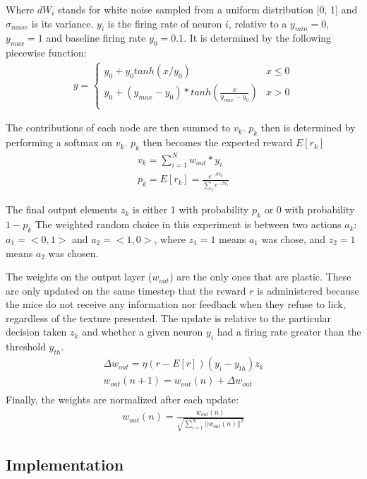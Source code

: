 \documentclass[11pt]{article}
\begin{document}
Where \(dW_i\) stands for white noise sampled from a uniform
distribution {[}0, 1{]} and \(\sigma_{noise}\) is its variance. \(y_i\)
is the firing rate of neuron \(i\), relative to a \(y_{min}=0\),
\(y_{max}=1\) and baseline firing rate \(y_0 = 0.1\). It is determined
by the following piecewise function: \begin{align}
y=   \left\{
\begin{array}{ll}
      y_0 + y_0 tanh(x/y_0) & x \leq 0   \\
      y_0 + (y_{max} - y_0)*tanh(\frac{x}{y_{max}- y_0}) & x > 0 \\
\end{array} 
\right.
\end{align}

The contributions of each node are then summed to \(v_k\). \(p_k\) then
is determined by performing a softmax on \(v_k\). \(p_k\) then becomes
the expected reward \(E[r_k]\) \begin{align}
v_k = \sum_{i=1}^N w_{out} * y_i \\
p_k = E[r_k] = \frac{e^{-\beta v_k}}{\sum_i e^{-\beta v_i}}
\end{align}

The final output elements \(z_k\) is either 1 with probability \(p_k\)
or 0 with probability \(1 - p_k\) The weighted random choice in this
experiment is between two actions \(a_k\): \(a_1=<0, 1>\) and
\(a_2=<1,0>\), where \(z_1 = 1\) means \(a_1\) was chose, and \(z_2=1\)
means \(a_2\) was chosen.

The weights on the output layer (\(w_{out}\)) are the only ones that are
plastic. These are only updated on the same timestep that the reward
\(r\) is administered because the mice do not receive any information
nor feedback when they refuse to lick, regardless of the texture
presented. The update is relative to the particular decision taken
\(z_k\) and whether a given neuron \(y_i\) had a firing rate greater
than the threshold \(y_{th}\). \begin{align}
\Delta w_{out} = \eta (r - E[r]) (y_i - y_{th}) z_k \\
w_{out}(n + 1) = w_{out}(n) + \Delta w_{out} \\
\end{align} Finally, the weights are normalized after each update:
\begin{align}
w_{out}(n) = \frac{w_{out}(n)}{\sqrt{\sum_{i=1}^N ||w_{out}(n)||^2}}
\end{align}

\hypertarget{implementation}{%
\subsection{Implementation}\label{implementation}}
\end{document}

